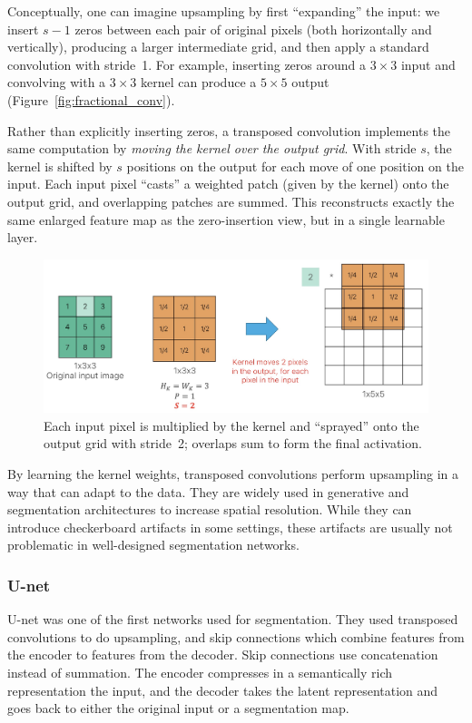 Conceptually, one can imagine upsampling by first “expanding” the input: we insert \(s-1\) zeros between each pair of original pixels (both horizontally and vertically), producing a larger intermediate grid, and then apply a standard convolution with stride~1. For example, inserting zeros around a \(3\times3\) input and convolving with a \(3\times3\) kernel can produce a \(5\times5\) output (Figure~\ref{fig:fractional_conv}).

Rather than explicitly inserting zeros, a transposed convolution implements the same computation by \emph{moving the kernel over the output grid}.  With stride \(s\), the kernel is shifted by \(s\) positions on the output for each move of one position on the input.  Each input pixel “casts” a weighted patch (given by the kernel) onto the output grid, and overlapping patches are summed.  This reconstructs exactly the same enlarged feature map as the zero-insertion view, but in a single learnable layer.

\begin{figure}[htbp]
  \centering
  \includegraphics[width=0.7\linewidth]{./img/transposed_conv.jpg}
  \caption{Each input pixel is multiplied by the kernel and “sprayed” onto the output grid with stride~2; overlaps sum to form the final activation.}
\end{figure}

By learning the kernel weights, transposed convolutions perform upsampling in a way that can adapt to the data.  They are widely used in generative and segmentation architectures to increase spatial resolution.  While they can introduce checkerboard artifacts in some settings, these artifacts are usually not problematic in well-designed segmentation networks.

\subsubsection{U-net}

U-net was one of the first networks used for segmentation.
They used transposed convolutions to do upsampling, and skip connections which combine features from the encoder to features from the decoder.
Skip connections use concatenation instead of summation.
The encoder compresses in a semantically rich representation the input, and the decoder takes the latent representation and goes back to either the original input or a segmentation map.

